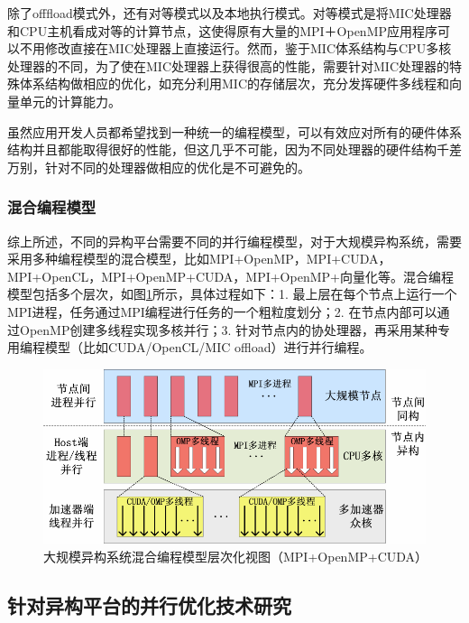 除了offfload模式外，还有对等模式以及本地执行模式。对等模式是将MIC处理器和CPU主机看成对等的计算节点，这使得原有大量的MPI＋OpenMP应用程序可以不用修改直接在MIC处理器上直接运行。然而，鉴于MIC体系结构与CPU多核处理器的不同，为了使在MIC处理器上获得很高的性能，需要针对MIC处理器的特殊体系结构做相应的优化，如充分利用MIC的存储层次，充分发挥硬件多线程和向量单元的计算能力。

虽然应用开发人员都希望找到一种统一的编程模型，可以有效应对所有的硬件体系结构并且都能取得很好的性能，但这几乎不可能，因为不同处理器的硬件结构千差万别，针对不同的处理器做相应的优化是不可避免的。

\subsubsection{混合编程模型}
综上所述，不同的异构平台需要不同的并行编程模型，对于大规模异构系统，需要采用多种编程模型的混合模型，比如MPI+OpenMP，MPI+CUDA，MPI+OpenCL，MPI+OpenMP+CUDA，MPI+OpenMP+向量化等。混合编程模型包括多个层次，如图\ref{fig:hybrid_prog}所示，具体过程如下：1. 最上层在每个节点上运行一个MPI进程，任务通过MPI编程进行任务的一个粗粒度划分；2. 在节点内部可以通过OpenMP创建多线程实现多核并行；3. 针对节点内的协处理器，再采用某种专用编程模型（比如CUDA/OpenCL/MIC offload）进行并行编程。
\begin{figure}[ht!]
\centering
\includegraphics[width=0.8\linewidth]{figs/hybrid_prog}
\caption{大规模异构系统混合编程模型层次化视图（MPI+OpenMP+CUDA）}
\label{fig:hybrid_prog}
\end{figure}

\subsection{针对异构平台的并行优化技术研究}


